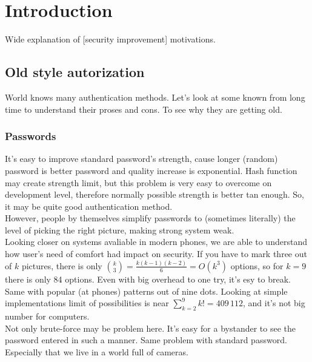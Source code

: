 \section{Introduction}
    Wide explanation of [security improvement] motivations.

    \subsection*{Old style autorization}
        World knows many authentication methods.
        Let's look at some known from long time
        to understand their proses and cons.
        To see why they are getting old.

        \subsubsection*{Passwords}
            It's easy to improve standard password's strength,
            cause longer (random) password is better password
            and quality increase is exponential.
            Hash function may create strength limit,
            but this problem is very easy to overcome on development level,
            therefore normally possible strength is better tan enough.
            So, it may be quite good authentication method.\\
            However, people by themselves simplify passwords to
            (sometimes literally) the level of picking the right picture,
            making strong system weak.\\
            Looking closer on systems avaliable in modern phones,
            we are able to understand how user's need of comfort
            had impact on security.
            If you have to mark three out of $k$ pictures, there
            is only $\binom{k}{3} = \frac{k(k-1)(k-2)}{6} = O(k^3)$ options,
            so for $k=9$ there is only 84 options.
            Even with big overhead to one try, it's esy to break.
            Same with popular (at phones) patterns out of
            nine dots. Looking at simple implementations
            limit of possibilities is near $\sum_{k=2}^9k! = 409\,112$,
            and it's not big number for computers.\\
            Not only brute-force may be problem here.
            It's easy for a bystander to see the password
            entered in such a manner. Same
            problem with standard password.
            Especially that we live in a world full of cameras.

